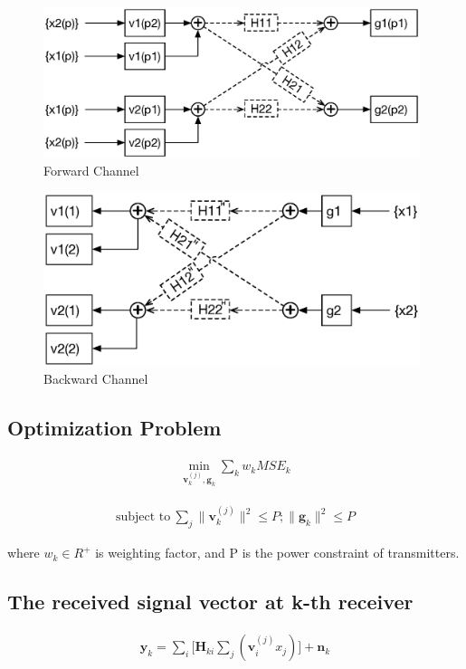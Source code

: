 \documentclass[11pt, oneside]{article}   	%
\begin{document}
 \begin{figure}[h]
    \centering
    \centerline{\includegraphics[width=110mm]{forward_channel_2}}
    \caption{Forward Channel}
\end{figure} 

\begin{figure}[h]
    \centering
    \centerline{\includegraphics[width=110mm]{backward_channel_2}}
    \caption{Backward Channel}
\end{figure} 

\subsection{Optimization Problem}
\begin{align*}
\min_{\textbf{v}_{k}^{(j)} ,\textbf{g}_{k}} \displaystyle\sum_{k} 	w_k	MSE_{k}	
\end{align*}



\begin{align*}
\text{subject to}  \ \displaystyle\sum_{j}	\|	\textbf{v}^{(j)}_{k}	\|^{2} \leq P; \| \textbf{g}_{k}	\|^{2} \leq P
\end{align*}

where $w_k\in R^{+}$ is weighting factor, and P is the power constraint of transmitters.

\subsection{The received signal vector at k-th receiver}
\begin{align*}
\textbf{y}_{k}  = \displaystyle\sum_{i}		\bigg[	\textbf{H}_{ki}	\displaystyle\sum_{j}	(\textbf{v}^{(j)}_{i}	x_j)		\bigg]	+\textbf{n}_{k}
\end{align*}
\end{document}
